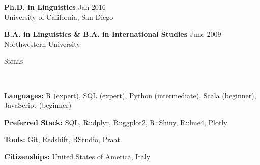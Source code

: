 \documentclass[9pt]{article}
\newenvironment{changemargin}[2]{%
  \begin{list}{}{%
    \setlength{\topsep}{0pt}%
    \setlength{\leftmargin}{#1}%
    \setlength{\rightmargin}{#2}%
    \setlength{\listparindent}{\parindent}%
    \setlength{\itemindent}{\parindent}%
    \setlength{\parsep}{\parskip}%
  }%
  \item[]}{\end{list}
}
\newcommand{\lineover}{
	\begin{changemargin}{-0.05in}{-0.05in}
		\vspace*{-8pt}
		\hrulefill \\
		\vspace*{-2pt}
	\end{changemargin}
}
\newcommand{\header}[1]{
	\begin{changemargin}{-0.5in}{-0.5in}
		\scshape{#1}\\
  	\lineover
	\end{changemargin}
}
\newenvironment{body} {
	\vspace*{-16pt}
	\begin{changemargin}{-0.25in}{-0.5in}
  }	
	{\end{changemargin}
}
\begin{document}
\begin{body}
	\vspace{14pt}
	
	\textbf{Ph.D. in Linguistics} \hfill Jan 2016\\
	University of California, San Diego\\
 	\medskip
	\medskip


	\textbf{B.A. in Linguistics \& B.A. in International Studies} \hfill June 2009\\
	Northwestern University\\
	\medskip
	\medskip

\end{body}

\smallskip


\header{\color{red}Skills}

\begin{body}
	\vspace{14pt}
	
	\textbf{Languages:} R (expert), SQL (expert), Python (intermediate), Scala (beginner), JavaScript (beginner)\\
	\medskip

	\textbf{Preferred Stack:} SQL, R::dplyr, R::ggplot2,  R::Shiny, R::lme4, Plotly\\
	\medskip
	
	\textbf{Tools:} Git, Redshift, RStudio, Praat\\
	\medskip
	
	\textbf{Citizenships:} United States of America, Italy\\
	\medskip

\end{body}
\end{document}
